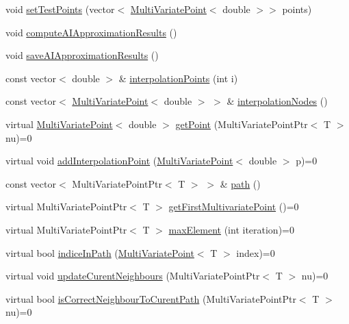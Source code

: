 \begin{DoxyCompactItemize}
\item 
void \hyperlink{class_interpolation_a976978e385d7ec3ed5506f1ca96938b3}{set\+Test\+Points} (vector$<$ \hyperlink{class_multi_variate_point}{Multi\+Variate\+Point}$<$ double $>$$>$ points)
\item 
void \hyperlink{class_interpolation_a024b108311beb323da7b5dafc2dc3481}{compute\+A\+I\+Approximation\+Results} ()
\item 
void \hyperlink{class_interpolation_a8f7ae9ddb58ff7e8e6228154483669a7}{save\+A\+I\+Approximation\+Results} ()
\item 
const vector$<$ double $>$ \& \hyperlink{class_interpolation_aaf0b60a3c3c293e30ae101470da299d6}{interpolation\+Points} (int i)
\item 
const vector$<$ \hyperlink{class_multi_variate_point}{Multi\+Variate\+Point}$<$ double $>$ $>$ \& \hyperlink{class_interpolation_a68c347c599d06d34239e86b1851aef27}{interpolation\+Nodes} ()
\item 
virtual \hyperlink{class_multi_variate_point}{Multi\+Variate\+Point}$<$ double $>$ \hyperlink{class_interpolation_a88593453ec6ce21d53071ddd5bb52195}{get\+Point} (Multi\+Variate\+Point\+Ptr$<$ T $>$ nu)=0
\item 
virtual void \hyperlink{class_interpolation_aa2cd083f061f9c36750191da4466c665}{add\+Interpolation\+Point} (\hyperlink{class_multi_variate_point}{Multi\+Variate\+Point}$<$ double $>$ p)=0
\item 
const vector$<$ Multi\+Variate\+Point\+Ptr$<$ T $>$ $>$ \& \hyperlink{class_interpolation_a6820ea94303e15adad2c1608a94aea96}{path} ()
\item 
virtual Multi\+Variate\+Point\+Ptr$<$ T $>$ \hyperlink{class_interpolation_ac478b76075519faac66590e9e0df80f5}{get\+First\+Multivariate\+Point} ()=0
\item 
virtual Multi\+Variate\+Point\+Ptr$<$ T $>$ \hyperlink{class_interpolation_a92dcf9a209d2a8046b266b59811949d4}{max\+Element} (int iteration)=0
\item 
virtual bool \hyperlink{class_interpolation_a0f2153a7dbc31a1471816a9c6c32eff1}{indice\+In\+Path} (\hyperlink{class_multi_variate_point}{Multi\+Variate\+Point}$<$ T $>$ index)=0
\item 
virtual void \hyperlink{class_interpolation_ac2e37b60de1c7b6704be643563fedd91}{update\+Curent\+Neighbours} (Multi\+Variate\+Point\+Ptr$<$ T $>$ nu)=0
\item 
virtual bool \hyperlink{class_interpolation_a3a6ee60651baf1ee8adcd4b874a71523}{is\+Correct\+Neighbour\+To\+Curent\+Path} (Multi\+Variate\+Point\+Ptr$<$ T $>$ nu)=0
$$
\end{DoxyCompactItemize}
